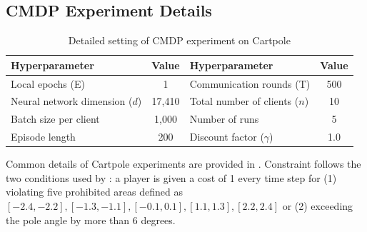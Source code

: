 \documentclass{article} %
\begin{document}
\subsection{CMDP Experiment Details}
\label{apdx:cartpole}
\begin{table}[!ht]
    \caption{Detailed setting of CMDP experiment on Cartpole}
    \label{tab:detail_cartpole}
    \centering
    \begin{tabular}{lc|lc}
        \toprule
        Hyperparameter & Value & Hyperparameter & Value \\
        \midrule
        Local epochs (E) & 1 & Communication rounds (T) & 500 \\
        Neural network dimension ($d$) & 17,410 & Total number of clients ($n$) & 10 \\
        Batch size per client & 1,000 & Number of runs & 5 \\
        Episode length & 200 & Discount factor ($\gamma$) & 1.0 \\
        \bottomrule
    \end{tabular}
\end{table}
Common details of Cartpole experiments are provided in .
Constraint follows the two conditions used by \cite{xu2021crpo}: a player is given a cost of 1 every time step for (1) violating five prohibited areas defined as $[-2.4,-2.2], [-1.3,-1.1],[-0.1,0.1],[1.1,1.3],[2.2,2.4]$ or (2) exceeding the pole angle by more than 6 degrees.
\end{document}
